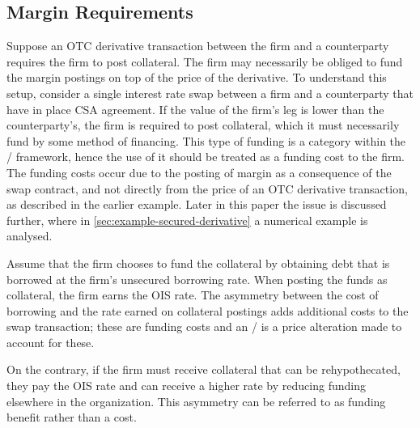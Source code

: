 \documentclass[main.tex]{subfiles}
\begin{document}
        \subsection*{Margin Requirements}
            Suppose an OTC derivative transaction between the firm and a counterparty requires the firm to post collateral.
            The firm may necessarily be obliged to fund the margin postings on top of the price of the derivative.
            To understand this setup,
            consider a single interest rate swap between a firm and a counterparty that have in place CSA agreement.
            If the value of the firm's leg is lower than the counterparty's,
            the firm is required to post collateral, 
            which it must necessarily fund by some method of financing.
            This type of funding is a category within the \FVA/ framework, 
            hence the use of it should be treated as a funding cost to the firm.
            The funding costs occur due to the posting of margin as a consequence of the swap contract,
            and not directly from the price of an OTC derivative transaction,
            as described in the earlier example.
            Later in this paper the issue is discussed further, 
            where in \cref{sec:example-secured-derivative} a numerical example is analysed.
            
            Assume that the firm chooses to fund the collateral by obtaining debt
            that is borrowed at the firm's unsecured borrowing rate.
            When posting the funds as collateral, the firm earns the OIS rate.
            The asymmetry between the cost of borrowing and the rate earned on collateral postings
            adds additional costs to the swap transaction; 
            these are funding costs and an \FVA/ is a price alteration made to account for these.

            On the contrary, if the firm must receive collateral that can be rehypothecated,
            they pay the OIS rate and can receive a higher rate
            by reducing funding elsewhere in the organization.
            This asymmetry can be referred to as funding benefit rather than a cost.
\end{document}
